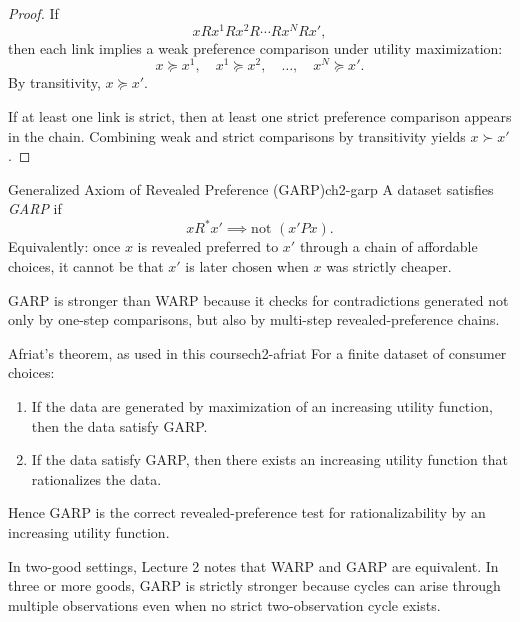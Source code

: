 \begin{proof}
If
\[
x R x^1 R x^2 R \cdots R x^N R x',
\]
then each link implies a weak preference comparison under utility maximization:
\[
x \succeq x^1,\quad x^1 \succeq x^2,\quad \dots,\quad x^N \succeq x'.
\]
By transitivity, $x \succeq x'$.

If at least one link is strict, then at least one strict preference comparison appears in the chain. Combining weak and strict comparisons by transitivity yields $x \succ x'$.
\end{proof}

\begin{definition}{Generalized Axiom of Revealed Preference (GARP)}{ch2-garp}
A dataset satisfies \emph{GARP} if
\[
x R^* x' \implies \text{not }(x' P x).
\]
Equivalently: once $x$ is revealed preferred to $x'$ through a chain of affordable choices, it cannot be that $x'$ is later chosen when $x$ was strictly cheaper.
\end{definition}

GARP is stronger than WARP because it checks for contradictions generated not only by one-step comparisons, but also by multi-step revealed-preference chains.

\begin{theorem}{Afriat's theorem, as used in this course}{ch2-afriat}
For a finite dataset of consumer choices:
\begin{enumerate}
    \item If the data are generated by maximization of an increasing utility function, then the data satisfy GARP.
    \item If the data satisfy GARP, then there exists an increasing utility function that rationalizes the data.
\end{enumerate}
Hence GARP is the correct revealed-preference test for rationalizability by an increasing utility function.
\end{theorem}

\begin{examtip}
In two-good settings, Lecture 2 notes that WARP and GARP are equivalent. In three or more goods, GARP is strictly stronger because cycles can arise through multiple observations even when no strict two-observation cycle exists.
\end{examtip}

